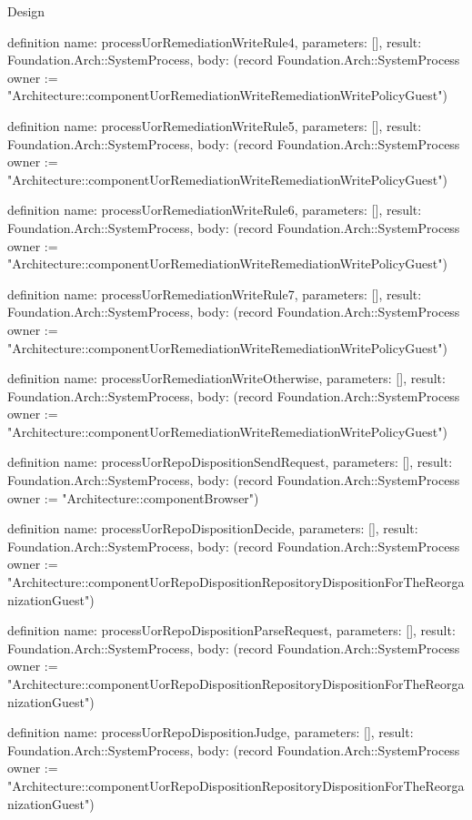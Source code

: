 \begin{lexlean}{Design}
\begin{semanticmodule}
definition{
  name: processUorRemediationWriteRule4,
  parameters: [],
  result: Foundation.Arch::SystemProcess,
  body: (record Foundation.Arch::SystemProcess {owner := "Architecture::componentUorRemediationWriteRemediationWritePolicyGuest"})
}

definition{
  name: processUorRemediationWriteRule5,
  parameters: [],
  result: Foundation.Arch::SystemProcess,
  body: (record Foundation.Arch::SystemProcess {owner := "Architecture::componentUorRemediationWriteRemediationWritePolicyGuest"})
}

definition{
  name: processUorRemediationWriteRule6,
  parameters: [],
  result: Foundation.Arch::SystemProcess,
  body: (record Foundation.Arch::SystemProcess {owner := "Architecture::componentUorRemediationWriteRemediationWritePolicyGuest"})
}

definition{
  name: processUorRemediationWriteRule7,
  parameters: [],
  result: Foundation.Arch::SystemProcess,
  body: (record Foundation.Arch::SystemProcess {owner := "Architecture::componentUorRemediationWriteRemediationWritePolicyGuest"})
}

definition{
  name: processUorRemediationWriteOtherwise,
  parameters: [],
  result: Foundation.Arch::SystemProcess,
  body: (record Foundation.Arch::SystemProcess {owner := "Architecture::componentUorRemediationWriteRemediationWritePolicyGuest"})
}

definition{
  name: processUorRepoDispositionSendRequest,
  parameters: [],
  result: Foundation.Arch::SystemProcess,
  body: (record Foundation.Arch::SystemProcess {owner := "Architecture::componentBrowser"})
}

definition{
  name: processUorRepoDispositionDecide,
  parameters: [],
  result: Foundation.Arch::SystemProcess,
  body: (record Foundation.Arch::SystemProcess {owner := "Architecture::componentUorRepoDispositionRepositoryDispositionForTheReorganizationGuest"})
}

definition{
  name: processUorRepoDispositionParseRequest,
  parameters: [],
  result: Foundation.Arch::SystemProcess,
  body: (record Foundation.Arch::SystemProcess {owner := "Architecture::componentUorRepoDispositionRepositoryDispositionForTheReorganizationGuest"})
}

definition{
  name: processUorRepoDispositionJudge,
  parameters: [],
  result: Foundation.Arch::SystemProcess,
  body: (record Foundation.Arch::SystemProcess {owner := "Architecture::componentUorRepoDispositionRepositoryDispositionForTheReorganizationGuest"})
}


\end{semanticmodule}
\end{lexlean}
